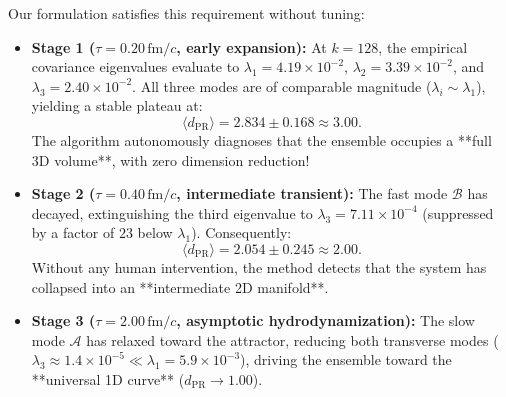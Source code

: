 \documentclass[11pt,a4paper]{article}
\begin{document}
Our formulation satisfies this requirement without tuning:
\begin{itemize}
    \item \textbf{Stage 1 ($\tau = 0.20\,\mathrm{fm}/c$, early expansion):} At $k = 128$, the empirical covariance eigenvalues evaluate to $\lambda_1 = 4.19\times 10^{-2}$, $\lambda_2 = 3.39\times 10^{-2}$, and $\lambda_3 = 2.40\times 10^{-2}$. All three modes are of comparable magnitude ($\lambda_i \sim \lambda_1$), yielding a stable plateau at:
    \begin{equation}
        \langle d_{\mathrm{PR}} \rangle = 2.834 \pm 0.168 \approx 3.00.
    \end{equation}
    The algorithm autonomously diagnoses that the ensemble occupies a **full 3D volume**, with zero dimension reduction!
    \item \textbf{Stage 2 ($\tau = 0.40\,\mathrm{fm}/c$, intermediate transient):} The fast mode $\mathcal{B}$ has decayed, extinguishing the third eigenvalue to $\lambda_3 = 7.11\times 10^{-4}$ (suppressed by a factor of $23$ below $\lambda_1$). Consequently:
    \begin{equation}
        \langle d_{\mathrm{PR}} \rangle = 2.054 \pm 0.245 \approx 2.00.
    \end{equation}
    Without any human intervention, the method detects that the system has collapsed into an **intermediate 2D manifold**.
    \item \textbf{Stage 3 ($\tau = 2.00\,\mathrm{fm}/c$, asymptotic hydrodynamization):} The slow mode $\mathcal{A}$ has relaxed toward the attractor, reducing both transverse modes ($\lambda_3 \approx 1.4\times 10^{-5} \ll \lambda_1 = 5.9\times 10^{-3}$), driving the ensemble toward the **universal 1D curve** ($d_{\mathrm{PR}} \to 1.00$).
\end{itemize}
\end{document}
